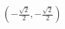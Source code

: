 \documentclass[preview]{standalone}
\begin{document}
\begin{align*}
\left(-\frac{\sqrt{2}}{2}, -\frac{\sqrt{2}}{2}\right)
\end{align*}
\end{document}
